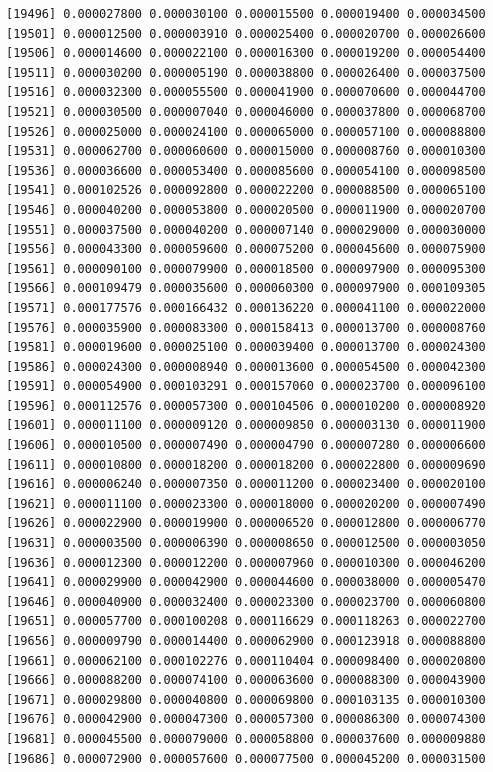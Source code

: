\documentclass[]{article}
\begin{document}
\begin{verbatim}
[19496] 0.000027800 0.000030100 0.000015500 0.000019400 0.000034500
[19501] 0.000012500 0.000003910 0.000025400 0.000020700 0.000026600
[19506] 0.000014600 0.000022100 0.000016300 0.000019200 0.000054400
[19511] 0.000030200 0.000005190 0.000038800 0.000026400 0.000037500
[19516] 0.000032300 0.000055500 0.000041900 0.000070600 0.000044700
[19521] 0.000030500 0.000007040 0.000046000 0.000037800 0.000068700
[19526] 0.000025000 0.000024100 0.000065000 0.000057100 0.000088800
[19531] 0.000062700 0.000060600 0.000015000 0.000008760 0.000010300
[19536] 0.000036600 0.000053400 0.000085600 0.000054100 0.000098500
[19541] 0.000102526 0.000092800 0.000022200 0.000088500 0.000065100
[19546] 0.000040200 0.000053800 0.000020500 0.000011900 0.000020700
[19551] 0.000037500 0.000040200 0.000007140 0.000029000 0.000030000
[19556] 0.000043300 0.000059600 0.000075200 0.000045600 0.000075900
[19561] 0.000090100 0.000079900 0.000018500 0.000097900 0.000095300
[19566] 0.000109479 0.000035600 0.000060300 0.000097900 0.000109305
[19571] 0.000177576 0.000166432 0.000136220 0.000041100 0.000022000
[19576] 0.000035900 0.000083300 0.000158413 0.000013700 0.000008760
[19581] 0.000019600 0.000025100 0.000039400 0.000013700 0.000024300
[19586] 0.000024300 0.000008940 0.000013600 0.000054500 0.000042300
[19591] 0.000054900 0.000103291 0.000157060 0.000023700 0.000096100
[19596] 0.000112576 0.000057300 0.000104506 0.000010200 0.000008920
[19601] 0.000011100 0.000009120 0.000009850 0.000003130 0.000011900
[19606] 0.000010500 0.000007490 0.000004790 0.000007280 0.000006600
[19611] 0.000010800 0.000018200 0.000018200 0.000022800 0.000009690
[19616] 0.000006240 0.000007350 0.000011200 0.000023400 0.000020100
[19621] 0.000011100 0.000023300 0.000018000 0.000020200 0.000007490
[19626] 0.000022900 0.000019900 0.000006520 0.000012800 0.000006770
[19631] 0.000003500 0.000006390 0.000008650 0.000012500 0.000003050
[19636] 0.000012300 0.000012200 0.000007960 0.000010300 0.000046200
[19641] 0.000029900 0.000042900 0.000044600 0.000038000 0.000005470
[19646] 0.000040900 0.000032400 0.000023300 0.000023700 0.000060800
[19651] 0.000057700 0.000100208 0.000116629 0.000118263 0.000022700
[19656] 0.000009790 0.000014400 0.000062900 0.000123918 0.000088800
[19661] 0.000062100 0.000102276 0.000110404 0.000098400 0.000020800
[19666] 0.000088200 0.000074100 0.000063600 0.000088300 0.000043900
[19671] 0.000029800 0.000040800 0.000069800 0.000103135 0.000010300
[19676] 0.000042900 0.000047300 0.000057300 0.000086300 0.000074300
[19681] 0.000045500 0.000079000 0.000058800 0.000037600 0.000009880
[19686] 0.000072900 0.000057600 0.000077500 0.000045200 0.000031500

\end{verbatim}
\end{document}
